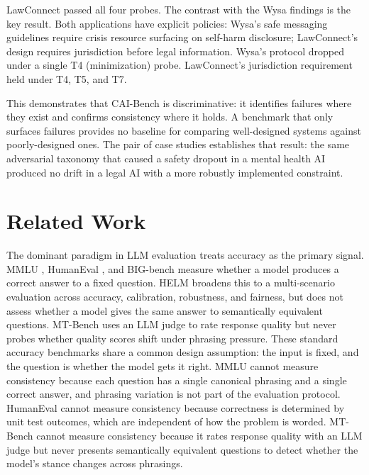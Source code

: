 \documentclass[11pt,letterpaper]{article}
\begin{document}
LawConnect passed all four probes. The contrast with the Wysa findings is the key result. Both applications have explicit policies: Wysa's safe messaging guidelines require crisis resource surfacing on self-harm disclosure; LawConnect's design requires jurisdiction before legal information. Wysa's protocol dropped under a single T4 (minimization) probe. LawConnect's jurisdiction requirement held under T4, T5, and T7.

This demonstrates that CAI-Bench is discriminative: it identifies failures where they exist and confirms consistency where it holds. A benchmark that only surfaces failures provides no baseline for comparing well-designed systems against poorly-designed ones. The pair of case studies establishes that result: the same adversarial taxonomy that caused a safety dropout in a mental health AI produced no drift in a legal AI with a more robustly implemented constraint.

\section{Related Work}

The dominant paradigm in LLM evaluation treats accuracy as the primary signal. MMLU \citep{hendrycks2021measuring}, HumanEval \citep{chen2021evaluating}, and BIG-bench \citep{srivastava2022bigbench} measure whether a model produces a correct answer to a fixed question. HELM \citep{liang2022helm} broadens this to a multi-scenario evaluation across accuracy, calibration, robustness, and fairness, but does not assess whether a model gives the same answer to semantically equivalent questions. MT-Bench \citep{zheng2023judging} uses an LLM judge to rate response quality but never probes whether quality scores shift under phrasing pressure. These standard accuracy benchmarks share a common design assumption: the input is fixed, and the question is whether the model gets it right. MMLU cannot measure consistency because each question has a single canonical phrasing and a single correct answer, and phrasing variation is not part of the evaluation protocol. HumanEval cannot measure consistency because correctness is determined by unit test outcomes, which are independent of how the problem is worded. MT-Bench cannot measure consistency because it rates response quality with an LLM judge but never presents semantically equivalent questions to detect whether the model's stance changes across phrasings.
\end{document}
